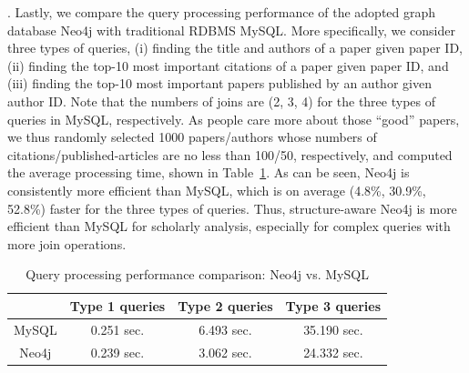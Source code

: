 .
Lastly, we compare the query processing performance of the adopted graph database Neo4j with traditional RDBMS MySQL. More specifically, we consider three types of queries, \ie (i) finding the title and authors of a paper given paper ID, (ii) finding the top-10 most important citations of a paper given paper ID, and (iii) finding the top-10 most important papers published by an author given author ID.
Note that the numbers of joins are (2, 3, 4) for the three types of queries in MySQL, respectively. As people care more about those ``good'' papers, we thus randomly selected 1000 papers/authors whose numbers of citations/published-articles are no less than 100/50, respectively, and computed the average processing time, shown in Table~\ref{tab-compare}.
%
As can be seen, Neo4j is consistently more efficient than MySQL, which is on average (4.8\%, 30.9\%, 52.8\%) faster for the three types of queries.
Thus, structure-aware Neo4j is more efficient than MySQL for scholarly analysis, especially for complex queries with more join operations.


\begin{table}[t!]
\begin{center}
\caption{Query processing performance comparison: Neo4j vs. MySQL}
\vspace{-2ex}
\label{tab-compare}
\begin{scriptsize}
\begin{tabular}{c c c c} %
\hline
{} & {Type 1 queries} & {Type 2 queries} & {Type 3 queries}\\
\hline
MySQL & 0.251 sec.  & 6.493 sec. & 35.190 sec. \\
Neo4j & 0.239 sec.  & 3.062 sec. & 24.332 sec. \\
\hline
\end{tabular} 
\end{scriptsize}
\vspace{-3ex}
\end{center}
\end{table}



